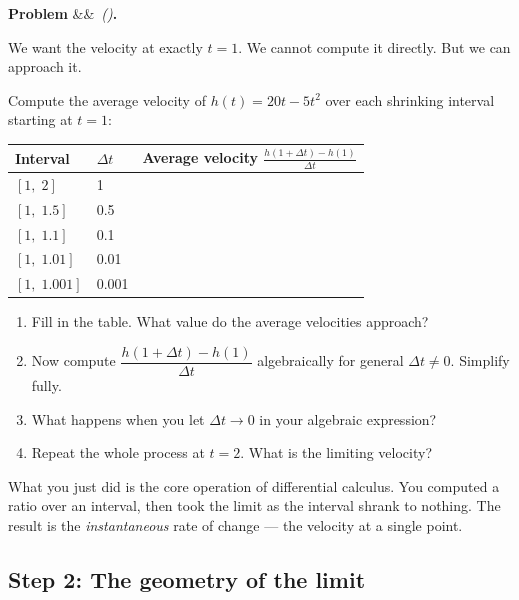 \documentclass[12pt, a4paper]{article}
\newcounter{problem}
\newenvironment{problem}[1][]{%
  \refstepcounter{problem}%
  \par\vspace{6pt}%
  \noindent\textbf{\color{MidBlue}Problem \theproblem}%
  \ifx&#1&\else\ \textit{(#1)}\fi\textbf{.}\enskip
}{\par\vspace{4pt}}
\begin{document}
\begin{problem}
\label{prob:shrink_interval}
We want the velocity at exactly $t = 1$. We cannot compute it directly. But we can approach it.

Compute the average velocity of $h(t) = 20t - 5t^2$ over each shrinking interval starting at $t = 1$:

\begin{center}
\begin{tabular}{lll}
\toprule
\textbf{Interval} & \textbf{$\Delta t$} & \textbf{Average velocity} $\frac{h(1+\Delta t) - h(1)}{\Delta t}$ \\
\midrule
$[1,\; 2]$      & 1     & \\
$[1,\; 1.5]$    & 0.5   & \\
$[1,\; 1.1]$    & 0.1   & \\
$[1,\; 1.01]$   & 0.01  & \\
$[1,\; 1.001]$  & 0.001 & \\
\bottomrule
\end{tabular}
\end{center}

\begin{enumerate}[label=(\alph*), topsep=2pt]
  \item Fill in the table. What value do the average velocities approach?
  \item Now compute $\dfrac{h(1 + \Delta t) - h(1)}{\Delta t}$ algebraically for general $\Delta t \neq 0$. Simplify fully.
  \item What happens when you let $\Delta t \to 0$ in your algebraic expression?
  \item Repeat the whole process at $t = 2$. What is the limiting velocity?
\end{enumerate}
\end{problem}

\medskip
What you just did is the core operation of differential calculus. You computed a ratio over an interval, then took the limit as the interval shrank to nothing. The result is the \emph{instantaneous} rate of change --- the velocity at a single point.

\subsection{Step 2: The geometry of the limit}
\end{document}
